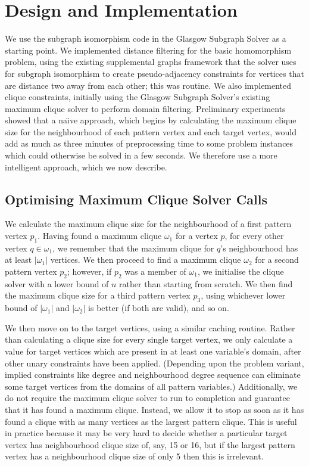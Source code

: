 \documentclass{article}
\begin{document}
\section{Design and Implementation}

We use the subgraph isomorphism code in the Glasgow Subgraph Solver \cite{DBLP:conf/gg/McCreeshP020}
as a starting point.  We implemented distance filtering for the basic homomorphism problem, using
the existing supplemental graphs framework that the solver uses for subgraph isomorphism to create
pseudo-adjacency constraints for vertices that are distance two away from each other; this was
routine.  We also implemented clique constraints, initially using the Glasgow Subgraph Solver's
existing maximum clique solver to perform domain filtering. Preliminary experiments showed that a
na{\"\i}ve approach, which begins by calculating the maximum clique size for the neighbourhood of
each pattern vertex and each target vertex, would add as much as three minutes of preprocessing time
to some problem instances which could otherwise be solved in a few seconds. We therefore use a more
intelligent approach, which we now describe.

\subsection{Optimising Maximum Clique Solver Calls}

We calculate the maximum clique size for the neighbourhood of a first pattern vertex $p_1$.  Having
found a maximum clique $\omega_1$ for a vertex $p$, for every other vertex $q \in \omega_1$, we
remember that the maximum clique for $q$'s neighbourhood has at least $|\omega_1|$ vertices. We then
proceed to find a maximum clique $\omega_2$ for a second pattern vertex $p_2$; however, if $p_2$ was
a member of $\omega_1$, we initialise the clique solver with a lower bound of $n$ rather than
starting from scratch. We then find the maximum clique size for a third pattern vertex $p_3$, using
whichever lower bound of $|\omega_1|$ and $|\omega_2|$ is better (if both are valid), and so on.

We then move on to the target vertices, using a similar caching routine. Rather than calculating a
clique size for every single target vertex, we only calculate a value for target vertices which are
present in at least one variable's domain, after other unary constraints have been applied.
(Depending upon the problem variant, implied constraints like degree and neighbourhood degree
sequence can eliminate some target vertices from the domains of all pattern variables.)
Additionally, we do not require the maximum clique solver to run to completion and guarantee that it
has found a maximum clique. Instead, we allow it to stop as soon as it has found a clique with as
many vertices as the largest pattern clique. This is useful in practice because it may be very hard
to decide whether a particular target vertex has neighbourhood clique size of, say, 15 or 16, but if
the largest pattern vertex has a neighbourhood clique size of only 5 then this is irrelevant.
\end{document}
